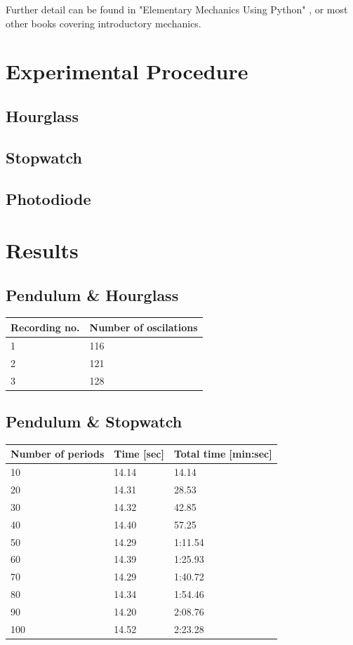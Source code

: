 \documentclass[%
 reprint,
 amsmath,amssymb,
 aps,
]{revtex4-1}
\begin{document}
	Further detail can be found in "Elementary Mechanics Using Python" \cite{elempy}, or most other books covering introductory mechanics.

\section{Experimental Procedure}
	\subsection{\label{subsec:hourglass}Hourglass}
	\subsection{\label{subsect:stopwatch}Stopwatch}
	\subsection{Photodiode}
\section{Results}
	\subsection{Pendulum \& Hourglass}
	\begin{center} %
	    \begin{tabular}{| l | l |}
		    \hline
		    Recording no. & Number of oscilations\\ \hline
		    1 & 116 \\ \hline
		    2 & 121 \\ \hline
		    3 & 128 \\ \hline
	    \end{tabular}
	\end{center}

	\subsection{Pendulum \& Stopwatch}
	\begin{center} %
	    \begin{tabular}{| p{1.5cm} | p{2cm} | p{2cm} |}
		    \hline
		    Number of periods & Time [sec] & Total time [min:sec] \\ \hline
		    10 & 14.14 & 14.14 \\ \hline
		    20 & 14.31 & 28.53 \\ \hline
		    30 & 14.32 & 42.85 \\ \hline
		    40 & 14.40 & 57.25 \\ \hline
		    50 & 14.29 & 1:11.54 \\ \hline
		    60 & 14.39 & 1:25.93 \\ \hline
		    70 & 14.29 & 1:40.72 \\ \hline
		    80 & 14.34 & 1:54.46 \\ \hline
		    90 & 14.20 & 2:08.76 \\ \hline
		    100 & 14.52 & 2:23.28 \\ \hline
	    \end{tabular}
    \end{center}
    
\end{document}
